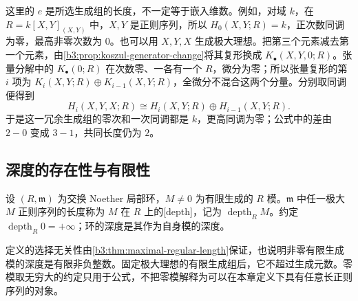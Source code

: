 这里的 \(e\) 是所选生成组的长度，不一定等于嵌入维数。例如，对域 \(k\)，在 \(R=k[X,Y]_{(X,Y)}\) 中，\(X,Y\) 是正则序列，所以 \(H_0(X,Y;R)=k\)，正次数同调为零，最高非零次数为 \(0\)。也可以用 \(X,Y,X\) 生成极大理想。把第三个元素减去第一个元素，由\cref{b3:prop:koszul-generator-change}将其复形换成 \(K_\bullet(X,Y,0;R)\)。张量分解中的 \(K_\bullet(0;R)\) 在次数零、一各有一个 \(R\)，微分为零；所以张量复形的第 \(i\) 项为 \(K_i(X,Y;R)\oplus K_{i-1}(X,Y;R)\)，全微分不混合这两个分量。分别取同调便得到
\[
	H_i(X,Y,X;R) \cong H_i(X,Y;R)\oplus H_{i-1}(X,Y;R).
\]
于是这一冗余生成组的零次和一次同调都是 \(k\)，更高同调为零；公式中的差由 \(2-0\) 变成 \(3-1\)，共同长度仍为 \(2\)。

\subsection{深度的存在性与有限性}
\label{b3:subsec:1601:02}

\begin{definition}\label{b3:def:depth}
	设 \((R,\mathfrak m)\) 为交换 Noether 局部环，\(M\ne0\) 为有限生成的 \(R\) 模。\(\mathfrak m\) 中任一极大 \(M\) 正则序列的长度称为 \(M\) 在 \(R\) 上的[depth]，记为 \(\operatorname{depth}_RM\)。约定 \(\operatorname{depth}_R0=+\infty\)；环的深度是其作为自身模的深度。
\end{definition}

定义的选择无关性由\cref{b3:thm:maximal-regular-length}保证，也说明非零有限生成模的深度是有限非负整数。固定极大理想的有限生成组后，它不超过生成元数。零模取无穷大的约定只用于公式，不把零模解释为可以在本章定义下具有任意长正则序列的对象。

